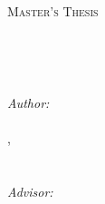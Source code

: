 \begin{titlepage}
    \begin{addmargin}[-2cm]{-3cm}
        \begin{center}
            
            {\color{CTtitle}\scshape\Huge \myUni\par}\vspace{2cm} %
            
            \textsc{\LARGE Master's Thesis}\\[0.6cm] %
            
            \begin{addmargin}[0cm]{0cm}
                \begin{center}
                    \HRule \\[0.4cm] %
                    {\huge \scshape \myTitle\par}\vspace{0.4cm} %
                    \HRule \\[1cm] %
                \end{center}
            \end{addmargin}
            
            
            \emph{Author:}\\[0.1cm]
            \myName \\
            \myDegree, \myUni\\ 
            \myLocation \\
            \texttt{\myEmail}\\[4cm]
            
            \emph{Advisor:}\\[0.1cm]
            \myAdvisor \\
            \myAdvisorUni \\
            \myAdvisorLocation \\[1cm]
            

\end{center}
\end{addmargin}
\end{titlepage}
